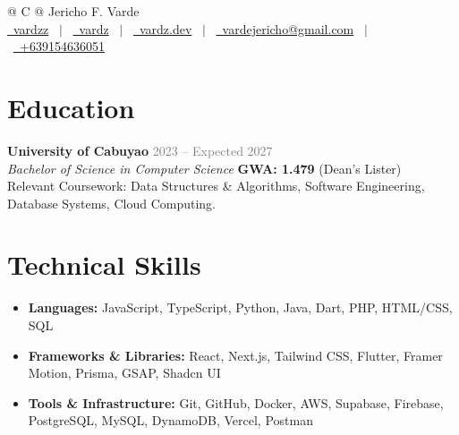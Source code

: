 \documentclass[a4paper,10pt]{article}
\begin{document}
\pagestyle{empty}

\begin{tabularx}{\linewidth}{@{} C @{}}
\Huge{Jericho F. Varde} \\[4pt]
\href{https://github.com/vardzz}{\raisebox{-0.05\height}\faGithub\ vardzz} \ $|$ \ 
\href{https://linkedin.com/in/vardz}{\raisebox{-0.05\height}\faLinkedin\ vardz} \ $|$ \ 
\href{https://www.vardz.dev/}{\raisebox{-0.05\height}\faGlobe \ vardz.dev} \ $|$ \ 
\href{mailto:vardejericho@gmail.com}{\raisebox{-0.05\height}\faEnvelope \ vardejericho@gmail.com} \ $|$ \ 
\href{tel:+639154636051}{\raisebox{-0.05\height}\faMobile \ +639154636051} \\
\end{tabularx}

\section{Education}
\textbf{University of Cabuyao} \hfill \textcolor{gray}{2023 -- Expected 2027} \\
\textit{Bachelor of Science in Computer Science} \hfill \textbf{GWA: 1.479} (Dean's Lister) \\
Relevant Coursework: Data Structures \& Algorithms, Software Engineering, Database Systems, Cloud Computing.

\section{Technical Skills}
\begin{itemize}
    \item \textbf{Languages:} JavaScript, TypeScript, Python, Java, Dart, PHP, HTML/CSS, SQL
    \item \textbf{Frameworks \& Libraries:} React, Next.js, Tailwind CSS, Flutter, Framer Motion, Prisma, GSAP, Shadcn UI
    \item \textbf{Tools \& Infrastructure:} Git, GitHub, Docker, AWS, Supabase, Firebase, PostgreSQL, MySQL, DynamoDB, Vercel, Postman
\end{itemize}
\end{document}
